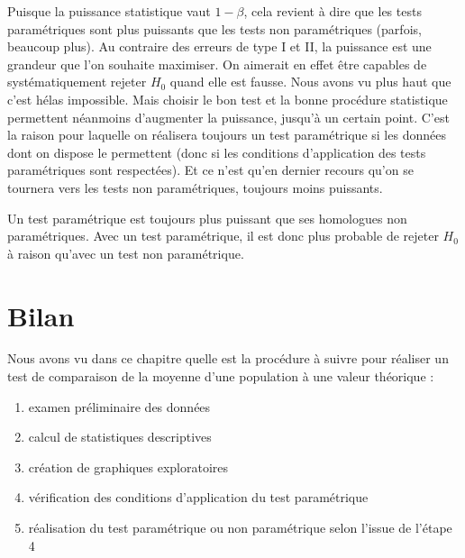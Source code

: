 \documentclass[
  french,
  a4paper,
  DIV=11,
  numbers=noendperiod,
  oneside]{scrreprt}
\providecommand{\tightlist}{%
  \setlength{\itemsep}{0pt}\setlength{\parskip}{0pt}}
\begin{document}
Puisque la puissance statistique vaut \(1 - \beta\), cela revient à dire
que les tests paramétriques sont plus puissants que les tests non
paramétriques (parfois, beaucoup plus). Au contraire des erreurs de type
I et II, la puissance est une grandeur que l'on souhaite maximiser. On
aimerait en effet être capables de systématiquement rejeter \(H_0\)
quand elle est fausse. Nous avons vu plus haut que c'est hélas
impossible. Mais choisir le bon test et la bonne procédure statistique
permettent néanmoins d'augmenter la puissance, jusqu'à un certain point.
C'est la raison pour laquelle on réalisera toujours un test paramétrique
si les données dont on dispose le permettent (donc si les conditions
d'application des tests paramétriques sont respectées). Et ce n'est
qu'en dernier recours qu'on se tournera vers les tests non
paramétriques, toujours moins puissants.

\begin{tcolorbox}[enhanced jigsaw, arc=.35mm, bottomrule=.15mm, bottomtitle=1mm, breakable, colback=white, colbacktitle=quarto-callout-important-color!10!white, colframe=quarto-callout-important-color-frame, coltitle=black, left=2mm, leftrule=.75mm, opacityback=0, opacitybacktitle=0.6, rightrule=.15mm, title=\textcolor{quarto-callout-important-color}{\faExclamation}\hspace{0.5em}{Important}, titlerule=0mm, toprule=.15mm, toptitle=1mm]

Un test paramétrique est toujours plus puissant que ses homologues non
paramétriques. Avec un test paramétrique, il est donc plus probable de
rejeter \(H_0\) à raison qu'avec un test non paramétrique.

\end{tcolorbox}

\section{Bilan}\label{bilan}

Nous avons vu dans ce chapitre quelle est la procédure à suivre pour
réaliser un test de comparaison de la moyenne d'une population à une
valeur théorique :

\begin{enumerate}
\def\labelenumi{\arabic{enumi}.}
\tightlist
\item
  examen préliminaire des données
\item
  calcul de statistiques descriptives
\item
  création de graphiques exploratoires
\item
  vérification des conditions d'application du test paramétrique
\item
  réalisation du test paramétrique ou non paramétrique selon l'issue de
  l'étape 4
\end{enumerate}
\end{document}

